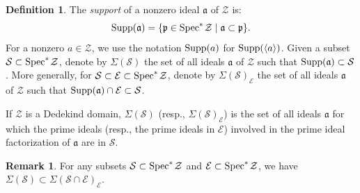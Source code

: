 \documentclass[11pt,a4paper,reqno]{amsart}
\theoremstyle{definition}
\newtheorem{defn}[thm]{Definition}
\newtheorem{rmk}[thm]{Remark}
\begin{document}
\begin{defn}
The \emph{support} of a nonzero ideal $\mathfrak{a}$ of $\mathcal{Z}$ is:
$$
{\rm Supp}(\mathfrak{a})=\{ \mathfrak{p} \in {\rm Spec}^\ast\hskip 1pt \mathcal{Z} \mid \mathfrak{a} \subset \mathfrak{p}\}.
$$
For a nonzero $a \in \mathcal{Z}$, we use the notation ${\rm Supp}(a)$ for ${\rm Supp}(\langle a \rangle)$. Given a subset $\mathcal{S} \subset {\rm Spec}^\ast \hskip 1pt \mathcal{Z}$, denote by $\Sigma({\mathcal{S}})$ the set of all ideals $\mathfrak{a}$ of $\mathcal{Z}$ such that ${\rm Supp}(\mathfrak{a}) \subset \mathcal{S}$. More generally, for $\mathcal{S} \subset \mathcal{E} \subset {\rm Spec}^\ast\hskip 1pt\mathcal{Z}$, denote by $\Sigma(\mathcal{S})_{\mathcal{E}}$ the set of all ideals $\mathfrak{a}$ of $\mathcal{Z}$ such that ${\rm Supp}(\mathfrak{a}) \cap \mathcal{E} \subset \mathcal{S}$.
\end{defn}
If $\mathcal{Z}$ is a Dedekind domain, $\Sigma(\mathcal{S})$ (resp., $\Sigma(\mathcal{S})_{\mathcal{E}}$) is the set of all ideals $\mathfrak{a}$ for which the prime ideals (resp., the prime ideals in $\mathcal{E}$) involved in the prime ideal factorization of $\mathfrak{a}$ are in $\mathcal{S}$.
\begin{rmk}\label{rmk:sigminter}
For any subsets $\mathcal{S} \subset {\rm Spec}^\ast \hskip 1pt \mathcal{Z}$ and $\mathcal{E} \subset {\rm Spec}^\ast \hskip 1pt \mathcal{Z}$, we have $\Sigma(\mathcal{S}) \subset \Sigma(\mathcal{S} \cap \mathcal{E})_{\mathcal{E}}$.
\end{rmk}
\end{document}
